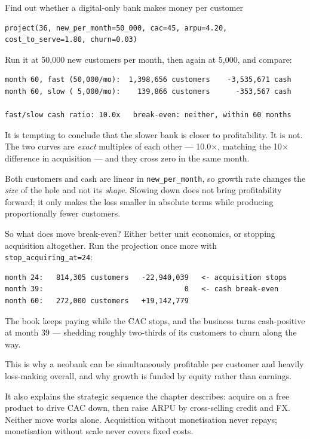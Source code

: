 \begin{labproject}{Find out whether a digital-only bank makes money per customer}
\begin{lstlisting}[style=utppython]
project(36, new_per_month=50_000, cac=45, arpu=4.20, cost_to_serve=1.80, churn=0.03)
\end{lstlisting}

Run it at 50{,}000 new customers per month, then again at 5{,}000, and compare:

\begin{lstlisting}[style=utpterminal]
month 60, fast (50,000/mo):  1,398,656 customers    -3,535,671 cash
month 60, slow ( 5,000/mo):    139,866 customers      -353,567 cash

fast/slow cash ratio: 10.0x   break-even: neither, within 60 months
\end{lstlisting}

\begin{pitfall}
It is tempting to conclude that the slower bank is closer to profitability. It is not. The two curves are \emph{exact} multiples of each other --- 10.0$\times$, matching the 10$\times$ difference in acquisition --- and they cross zero in the same month.

Both customers and cash are linear in \texttt{new\_per\_month}, so growth rate changes the \emph{size} of the hole and not its \emph{shape}. Slowing down does not bring profitability forward; it only makes the loss smaller in absolute terms while producing proportionally fewer customers.
\end{pitfall}

So what does move break-even? Either better unit economics, or stopping acquisition altogether. Run the projection once more with \texttt{stop\_acquiring\_at=24}:

\begin{lstlisting}[style=utpterminal]
month 24:   814,305 customers   -22,940,039   <- acquisition stops
month 39:                                 0   <- cash break-even
month 60:   272,000 customers   +19,142,779
\end{lstlisting}

The book keeps paying while the CAC stops, and the business turns cash-positive at month 39 --- shedding roughly two-thirds of its customers to churn along the way.

\begin{keyidea}
This is why a neobank can be simultaneously profitable per customer and heavily loss-making overall, and why growth is funded by equity rather than earnings.

It also explains the strategic sequence the chapter describes: acquire on a free product to drive CAC down, then raise ARPU by cross-selling credit and FX. Neither move works alone. Acquisition without monetisation never repays; monetisation without scale never covers fixed costs.


\end{keyidea}
\end{labproject}
